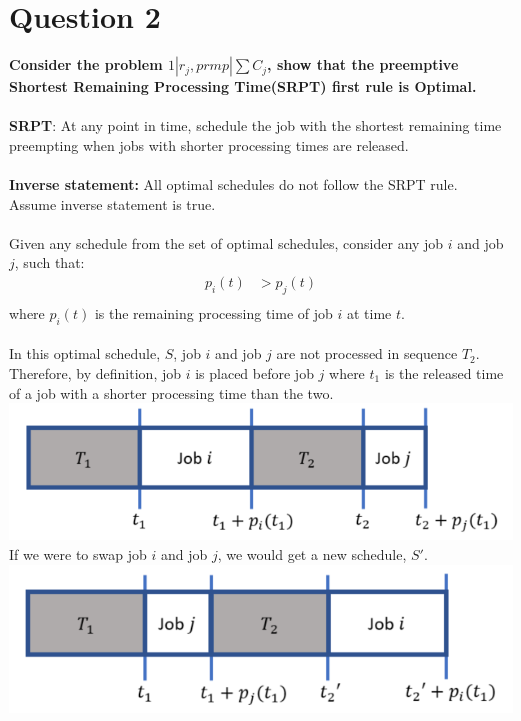\documentclass[a4paper, fleqn]{article}
\begin{document}
\section{Question 2}
\textbf{Consider the problem $1|r_j,prmp|\sum C_j$, show that the preemptive Shortest Remaining Processing Time(SRPT) first rule is Optimal.}\\
\vspace{1pt}\\
\textbf{SRPT}: At any point in time, schedule the job with the shortest remaining time preempting when jobs with shorter processing times are released.\\
\vspace{1pt}\\
\textbf{Inverse statement:} All optimal schedules do not follow the SRPT rule.\\
Assume inverse statement is true.\\
\vspace{1pt}\\
Given any schedule from the set of optimal schedules, consider any job $i$ and job $j$, such that:\\
$$
\begin{aligned}
p_i(t)&>p_j(t)\\
\end{aligned}
$$
where $p_i(t)$ is the remaining processing time of job $i$ at time $t$.\\
\vspace{1pt}\\
In this optimal schedule, $S$, job $i$ and job $j$ are not processed in sequence $T_2$.\\
Therefore, by definition, job $i$ is placed before job $j$ where $t_1$ is the released time of a job with a shorter processing time than the two.\\ 
\includegraphics[width=\linewidth]{./assets/201802131917.PNG}
If we were to swap job $i$ and job $j$, we would get a new schedule, $S'$.\\
\includegraphics[width=\linewidth]{./assets/201802132355.PNG}
\end{document}
